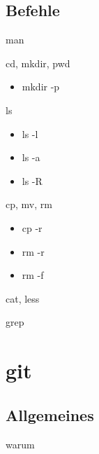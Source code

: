 \documentclass[t]{beamer}
\begin{document}
    \subsection{Befehle}
      \begin{frame}{man}
      \end{frame}

      \begin{frame}{cd, mkdir, pwd}
        \begin{itemize}
          \item mkdir -p
        \end{itemize}
      \end{frame}

      \begin{frame}{ls}
        \begin{itemize}
          \item ls -l\\
          \item ls -a\\
          \item ls -R
        \end{itemize}
      \end{frame}

      \begin{frame}{cp, mv, rm}
        \begin{itemize}
          \item cp -r\\
          \item rm -r\\
          \item rm -f
        \end{itemize}
      \end{frame}

      \begin{frame}{cat, less}
      \end{frame}

      \begin{frame}{grep}
      \end{frame}

  \section{git}
    \subsection{Allgemeines}
      \begin{frame}{warum}
      \end{frame}
\end{document}
